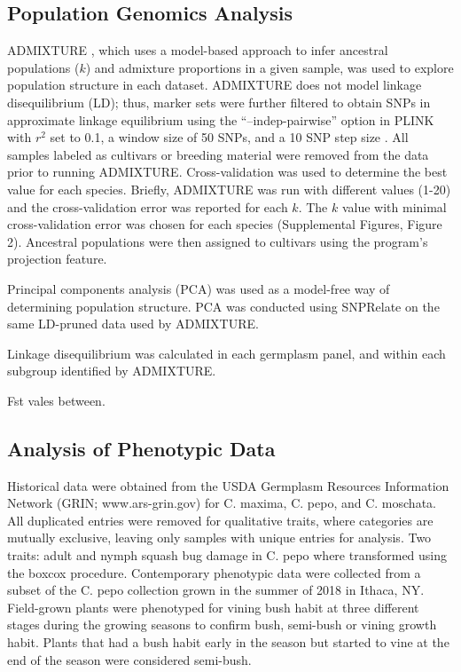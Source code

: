 \documentclass[utf8]{FrontiersinHarvard} %
\begin{document}
\subsection{Population Genomics Analysis}
ADMIXTURE \citep{Alexander2011}, which uses a model-based approach to infer ancestral populations ($k$) and admixture proportions in a given sample, was used to explore population structure in each dataset. ADMIXTURE does not model linkage disequilibrium (LD); thus, marker sets were further filtered to obtain SNPs in approximate linkage equilibrium using the “–indep-pairwise” option in PLINK \citep{Purcell2007} with $r^{2}$ set to 0.1, a window size of 50 SNPs, and a 10 SNP step size . All samples labeled as cultivars or breeding material were removed from the data prior to running ADMIXTURE. Cross-validation was used to determine the best  value for each species. Briefly, ADMIXTURE was run with different  values (1-20) and the cross-validation error was reported for each $k$. The $k$ value with minimal cross-validation error was chosen for each species (Supplemental Figures, Figure 2). Ancestral populations were then assigned to cultivars using the program’s projection feature.

Principal components analysis (PCA) was used as a model-free way of determining population structure. PCA was conducted using SNPRelate \citep{} on the same LD-pruned data used by ADMIXTURE.

Linkage disequilibrium was calculated in each germplasm panel, and within each subgroup identified by ADMIXTURE.

Fst vales between.  

\subsection{Analysis of Phenotypic Data}
Historical data were obtained from the USDA Germplasm Resources Information Network (GRIN; www.ars-grin.gov) for C. maxima, C. pepo, and C. moschata. All duplicated entries were removed for qualitative traits, where categories are mutually exclusive, leaving only samples with unique entries for analysis. Two traits: adult and nymph squash bug damage in C. pepo where transformed using the boxcox procedure. Contemporary phenotypic data were collected from a subset of the C. pepo collection grown in the summer of 2018 in Ithaca, NY. Field-grown plants were phenotyped for vining bush habit at three different stages during the growing seasons to confirm bush, semi-bush or vining growth habit. Plants that had a bush habit early in the season but started to vine at the end of the season were considered semi-bush.
\end{document}
